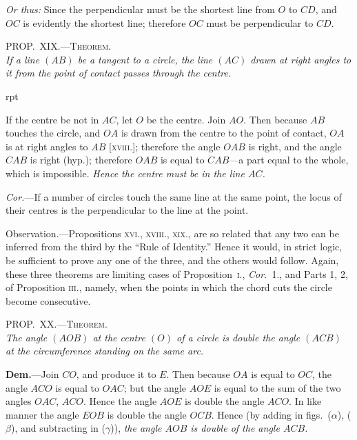 \documentclass[oneside]{book}
\newcommand\myprop[2]{
\bigskip\Needspace*{4\baselineskip}\begin{center}\textsc{#1}\\\medskip\emph{#2}\par\end{center}
}
\newcommand\imgflow[3]{
\setcounter{wrapwidth}{#1}
\begin{wrapfigure}[#2]{r}{\value{wrapwidth}pt}
\begin{center}
\vspace{-0.3in}
\end{center}
\end{wrapfigure}
}
\newcommand\imgcent[2]{
\begin{center}
\end{center}
}
\begin{document}
\begin{footnotesize}
\emph{Or thus:} Since the perpendicular must be the shortest line
from $O$ to $CD$, and $OC$ is evidently the shortest line; therefore
$OC$ must be perpendicular to $CD$.
\end{footnotesize}

\myprop{PROP\@.~XIX\@.---Theorem.}{If a line $(AB)$ be a tangent to a circle, the line $(AC)$
drawn at right angles to it from the point of contact passes
through the centre.}

\imgflow{130}{11}{f125}

If the centre be not in $AC$, let $O$ be the centre.
Join $AO$. Then because $AB$
touches the circle, and $OA$ is
drawn from the centre to the
point of contact, $OA$ is at right
angles to $AB$ [\textsc{xviii.}]; therefore
the angle $OAB$ is right,
and the angle $CAB$ is right
(hyp.); therefore $OAB$ is equal
to $CAB$---a part equal to the
whole, which is impossible.
\emph{Hence the centre must be in the line $AC$.}


\emph{Cor.}---If a number of circles touch the same line at
the same point, the locus of their centres is the perpendicular
to the line at the point.\par\medskip

\begin{footnotesize}
\textsf{Observation.}---Propositions \textsc{xvi., xviii., xix.,} are so related
that any two can be inferred from the third by the ``Rule of
Identity.'' Hence it would, in strict logic, be sufficient to prove
any one of the three, and the others would follow. Again, these
three theorems are limiting cases of Proposition~\textsc{i.}, \emph{Cor.}~1., and
Parts 1, 2, of Proposition \textsc{iii.}, namely, when the points in which
the chord cuts the circle become consecutive.
\end{footnotesize}

\myprop{PROP\@.~XX\@.---Theorem.}{The angle $(AOB)$ at the centre $(O)$ of a circle is double
the angle $(ACB)$ at the circumference standing on the
same arc.}

\imgcent{325}{f126}

\textbf{Dem.}---Join $CO$, and produce it to $E$. Then because
$OA$ is equal to $OC$, the angle $ACO$ is equal to $OAC$;
but the angle $AOE$ is equal to the sum of the two
angles $OAC$, $ACO$. Hence the angle $AOE$ is double
the angle $ACO$. In like manner the angle $EOB$ is
double the angle $OCB$. Hence (by adding in figs.~($\alpha$),
($\beta$), and subtracting in ($\gamma$)), \emph{the angle $AOB$ is double of
the angle $ACB$.}\par\smallskip
\end{document}
